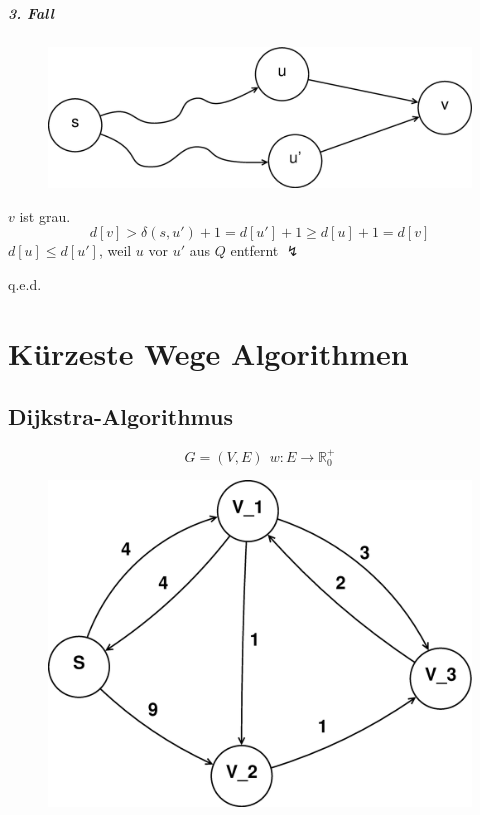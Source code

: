 \paragraph{3. Fall}
\begin{figure}
	\includegraphics[width=\linewidth]{16/Grafik/Beweis}
	\caption{}
	\label{fig:Beweis}
\end{figure}
$v$ ist grau.
\[ d[v]>\delta(s,u')+1=d[u']+1\geq d[u]+1=d[v] \]
$d[u]\leq d[u']$, weil $u$ vor $u'$ aus $Q$ entfernt $\lightning$
\begin{flushright}
	q.e.d.
\end{flushright}
\chapter{Kürzeste Wege Algorithmen}
\section{Dijkstra-Algorithmus}
\[ G=(V,E)~~w:E\rightarrow \mathbb{R}^+_0 \]
\begin{figure}[h]
\centering
\includegraphics[width=0.3\linewidth]{16/Grafik/Dijkstra}
\caption{}
\label{fig:Dijkstra}
\end{figure}

